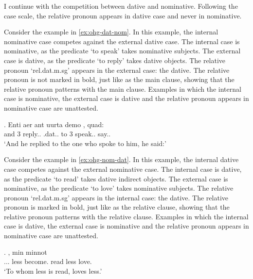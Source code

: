 I continue with the competition between dative and nominative. Following the case scale, the relative pronoun appears in dative case and never in nominative.

Consider the example in \ref{ex:ohg-dat-nom}. In this example, the internal nominative case competes against the external dative case.
The internal case is nominative, as the predicate  `to speak' takes nominative subjects.
The external case is dative, as the predicate  `to reply' takes dative objects.
The relative pronoun  `\ac{rel}.\ac{dat}.\ac{m}.\ac{sg}' appears in the external case: the dative. The relative pronoun is not marked in bold, just like as the main clause, showing that the relative pronoun patterns with the main clause.
Examples in which the internal case is nominative, the external case is dative and the relative pronoun appears in nominative case are unattested.

\exg. Enti aer {ant uurta} demo  , quad:\\
and 3 reply..\scsub{[dat]} .\ac{dat}.. {to 3} speak..\scsub{[nom]} say..\\
`And he replied to the one who spoke to him, he said:' \label{ex:ohg-dat-nom}

Consider the example in \ref{ex:ohg-nom-dat}. In this example, the internal dative case competes against the external nominative case.
The internal case is dative, as the predicate  `to read' takes dative indirect objects.
The external case is nominative, as the predicate  `to love' takes nominative subjects.
The relative pronoun  `\ac{rel}.\ac{dat}.\ac{m}.\ac{sg}' appears in the internal case: the dative. The relative pronoun is marked in bold, just like as the relative clause, showing that the relative pronoun patterns with the relative clause.
Examples in which the internal case is dative, the external case is nominative and the relative pronoun appears in nominative case are unattested.

\exg.    , min minnot\\
... less become. read\scsub{[dat]} less love.\scsub{[nom]}\\
`To whom less is read, loves less.' \label{ex:ohg-nom-dat}

